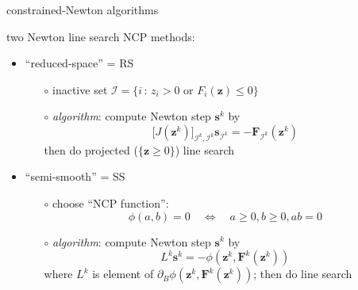 \documentclass[xcolor={dvipsnames}]{beamer}
\newcommand\bs{\mathbf{s}}
\newcommand\bz{\mathbf{z}}
\newcommand\bF{\mathbf{F}}
\begin{document}
\begin{frame}{constrained-Newton algorithms}

two Newton line search NCP methods:
\begin{itemize}
\item  ``reduced-space'' = \alert{RS}
    \begin{itemize}
    \item[$\circ$] inactive set $\mathcal{I} = \{i \,:\, z_i > 0 \text{ or } F_i(\bz) \le 0\}$
    \item[$\circ$] \emph{algorithm}: compute Newton step $\bs^k$ by
     $$\big[J(\bz^k)\big]_{\mathcal{I}^k,\mathcal{I}^k} \bs_{\mathcal{I}^k} = - \bF_{\mathcal{I}^k}(\bz^k)$$
     then do projected ($\{\bz\ge 0\}$) line search
    \end{itemize}
\item  ``semi-smooth'' = \alert{SS}
    \begin{itemize}
    \item[$\circ$] choose ``NCP function'':
\vspace{-2mm}
    $$\phi(a,b)=0 \quad \iff \quad a\ge 0, b\ge 0, ab=0$$
    \item[$\circ$] \emph{algorithm}: compute Newton step $\bs^k$ by
    $$L^k \bs^k = - \phi(\bz^k,\bF^k(\bz^k))$$
    where $L^k$ is element of $\partial_B \phi(\bz^k,\bF^k(\bz^k))$; then do line search
    \end{itemize}
\end{itemize}
\end{frame}
\end{document}

